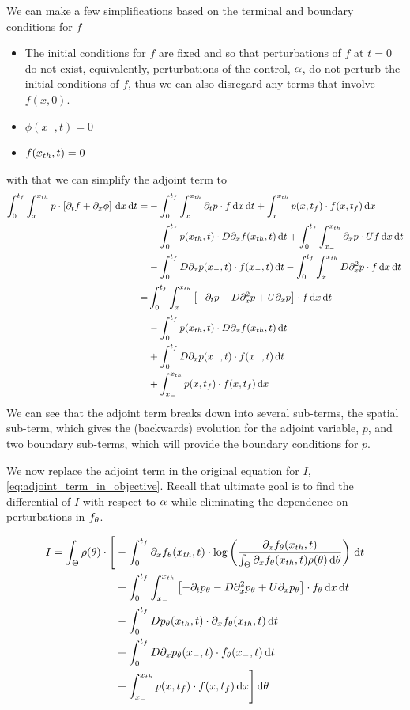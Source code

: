 \documentclass{article}
\begin{document}
We can make a few simplifications based on the terminal and boundary
conditions for $f$
\begin{itemize}
  \item The initial conditions for $f$ are fixed and so that perturbations of
  $f$ at $t=0$ do not exist, equivalently, perturbations of the  control, ${\alpha}$,
  do not perturb the initial conditions of $f$, thus we can also disregard any
  terms that involve $f(x,0)$.
  \item $\phi(x_-, t)=0$
  \item $f({ x_{th} }, t) = 0$ 
\end{itemize}
with that we can simplify the adjoint term to 
\def \tf {{t_f}}
\begin{align*}
\int_0^{\tf} \int_{x_-}^{\xth}
p \cdot \left[\di_t f  + \di_x \phi\right]
	\intd{x}\intd{t} 
=&
-\int_0^{\tf}\int_{x_-}^{\xth} \di_tp \cdot  f \intd{x}\intd{t}
+
\int_{x_-}^{\xth} p(x, \tf) \cdot f(x, \tf) \intd{x}  
\\ 
&- \int_{0}^{\tf} p(\xth,t) \cdot D\di_xf(\xth,t) \intd{t}
 + \int_0^{\tf}\int_{x_-}^{\xth} \di_xp \cdot  U f\intd{x}\intd{t}
\\
&- \int_{0}^{\tf} D\di_xp(x_-,t) \cdot f(x_-,t) \intd{t} 
 - \int_0^{\tf}\int_{x_-}^{\xth} D\di^2_xp \cdot  f\intd{x}\intd{t}
\\
=&
\int_0^{\tf}\int_{x_-}^{\xth} 
	\left[-\di_tp -  D\di^2_xp + U \di_xp \right]\cdot  f
\intd{x}\intd{t}
\\ 
&- \int_{0}^{\tf} p(\xth,t) \cdot D\di_xf(\xth,t) \intd{t}
\\
& + \int_{0}^{\tf} D\di_xp(x_-,t) \cdot f(x_-,t) \intd{t}
\\
& +
\int_{x_-}^{\xth} p(x, \tf) \cdot f(x, \tf) \intd{x} 
\end{align*}
We can see that the adjoint term breaks down into several sub-terms, the spatial
sub-term, which gives the (backwards) evolution for the adjoint variable, $p$,
and two boundary sub-terms, which will provide the boundary conditions for $p$. 

We now replace the adjoint term in the original equation for $I$,
\cref{eq:adjoint_term_in_objective}. Recall that ultimate goal is to find the
differential of $I$ with respect to ${\alpha}$ while eliminating the
dependence on perturbations in $f_{\theta}$. 

\begin{align*}
I=  
\int_\Theta  \rho(\th)\cdot \Bigg[ 
&-\int_0^{\tf} 
	  \di_xf_\th(\xth, t)  \cdot 
		\log \left( \frac{\di_xf_\th(\xth, t)}
						{\int_\Theta \di_xf_\th(\xth, t)\rho(\th)\intd{\th} } \right)
\intd{t} 
\\ &+
\int_0^{\tf}\int_{x_-}^{\xth} 
	\left[-\di_tp_\th -  D\di^2_xp_\th + U \di_xp_\th \right]\cdot  f_\th
\intd{x}\intd{t}
\\ 
&- \int_{0}^{\tf} D p_\th(\xth,t) \cdot \di_xf_\th(\xth,t) \intd{t}
\\
& + \int_{0}^{\tf} D\di_xp_\th(x_-,t) \cdot f_\th(x_-,t) \intd{t}
\\	& +
\int_{x_-}^{\xth} p(x, \tf) \cdot f(x, \tf) \intd{x}  
\Bigg]				\intd{\th}   
\end{align*}
\end{document}
